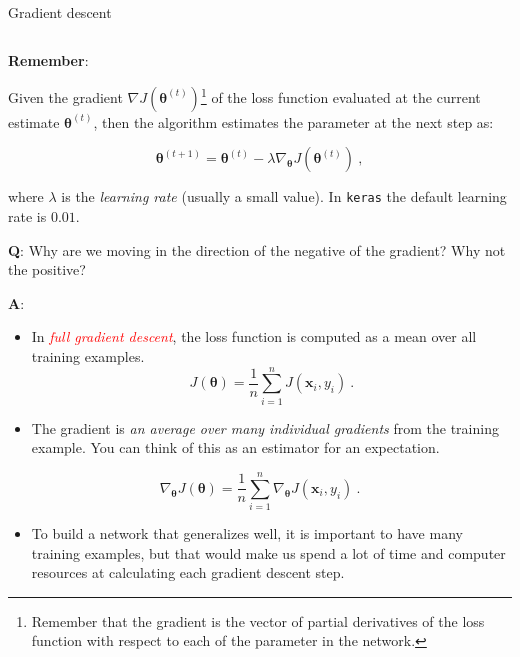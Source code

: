 \documentclass[10pt,ignorenonframetext,]{beamer}
\providecommand{\tightlist}{%
  \setlength{\itemsep}{0pt}\setlength{\parskip}{0pt}}
\begin{document}
\begin{frame}[fragile]

\begin{block}{Gradient descent}

\(~\)

\textbf{Remember}:

Given the gradient
\(\nabla J({\boldsymbol \theta}^{(t)})\)\footnote{Remember that the gradient is the vector of partial derivatives of the loss function with respect to each of the parameter in the network.}
of the loss function evaluated at the current estimate
\({\boldsymbol \theta}^{(t)}\), then the algorithm estimates the
parameter at the next step as:

\[{\boldsymbol \theta}^{(t+1)}={\boldsymbol \theta}^{(t)} - \lambda \nabla_{\boldsymbol \theta} J({\boldsymbol \theta}^{(t)}) \ , \]

where \(\lambda\) is the \emph{learning rate} (usually a small value).
In \texttt{keras} the default learning rate is \(0.01\).

\vspace{6mm}

\textbf{Q}: Why are we moving in the direction of the negative of the
gradient? Why not the positive?

\textbf{A}:

\end{block}

\end{frame}

\begin{frame}

\begin{itemize}
\item
  In \emph{\textcolor{red}{full gradient descent}}, the loss function is
  computed as a mean over all training examples. \[
  J({\boldsymbol \theta})=\frac{1}{n}\sum_{i=1}^n J({\boldsymbol x}_i, y_i) \ .
  \]
\item
  The gradient is \emph{an average over many individual gradients} from
  the training example. You can think of this as an estimator for an
  expectation.
\end{itemize}

\[
\nabla_{\boldsymbol \theta} J({\boldsymbol \theta})=\frac{1}{n}\sum_{i=1}^n \nabla_{\boldsymbol \theta} J({\boldsymbol x}_i, y_i) \ .
\]

\begin{itemize}
\tightlist
\item
  To build a network that generalizes well, it is important to have many
  training examples, but that would make us spend a lot of time and
  computer resources at calculating each gradient descent step.
\end{itemize}

\end{frame}
\end{document}
